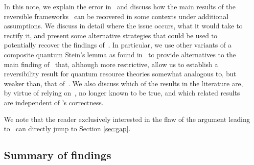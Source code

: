 \documentclass[11pt,notitlepage,tightenlines,nofootinbib,superscriptaddress]{revtex4-1}
\begin{document}
In this note, we explain the error in~\cite[Lemma~III.9]{Brandao2010} and discuss how the main results of the reversible frameworks~\cite{BrandaoPlenio1,BrandaoPlenio2,Brandao-Gour} can be recovered in some contexts under additional assumptions. We discuss in detail where the issue occurs, what it would take to rectify it, and present some alternative strategies that could be used to potentially recover the findings of~\cite{Brandao2010}. In particular, we use other variants of a composite quantum Stein's lemma as found in~\cite{brandao_adversarial,berta_composite} to provide alternatives to the main finding of~\cite{Brandao2010} that, although more restrictive, allow us to establish a reversibility result for quantum resource theories somewhat analogous to, but weaker than, that of~\cite{BrandaoPlenio1,BrandaoPlenio2,Brandao-Gour}. We also discuss which of the results in the literature are, by virtue of relying on~\cite{Brandao2010}, no longer known to be true, and which related results are independent of \cite{Brandao2010}'s correctness.

We note that the reader exclusively interested in the flaw of the argument leading to~\cite[Lemma~III.9]{Brandao2010} can directly jump to Section \ref{sec:gap}.


\subsection*{Summary of findings}
\end{document}
